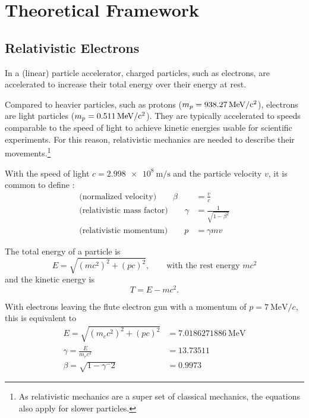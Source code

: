 \chapter{Theoretical Framework}
\section{Relativistic Electrons}
In a (linear) particle accelerator, charged particles, such as electrons, are accelerated to increase their total energy over their energy at rest.

Compared to heavier particles, such as protons ($m_p=\SI{938.27}{\mega\eV\per c\squared}$), electrons are light particles ($m_p=\SI{0.511}{\mega\eV\per c\squared}$). They are typically accelerated to speeds comparable to the speed of light to achieve kinetic energies usable for scientific experiments. For this reason, relativistic mechanics are needed to describe their movements.\footnote{As relativistic mechanics are a super set of classical mechanics, the equations also apply for slower particles.} \cite{Hinterberger1997}

With the speed of light $c=\SI{2.998e8}{\m\per\s}$ and the particle velocity $v$, it is common to define \cite{Wangler2008}:
\begin{align}\label{eq:theoreticalFramework_gammabeta}
\text{(normalized velocity)}\qquad\beta &= \frac{v}{c}\\
\text{(relativistic mass factor)}\qquad\gamma &= \frac{1}{\sqrt{1-\beta^2}} \\
\text{(relativistic momentum)}\qquad p &= \gamma m v 
\end{align}

The total energy of a particle is \cite{Hinterberger1997}
\begin{equation}
E=\sqrt{(mc^2)^2+(pc)^2},\qquad\text{with the rest energy } mc^2
\end{equation}
and the kinetic energy is
\begin{equation}
T=E-mc^2.
\end{equation}

With electrons leaving the \gls{flute} electron gun with a momentum of $p=\SI{7}{\MeV\per c}$, this is equivalent to
\begin{align}
E=\sqrt{(m_ec^2)^2+(pc)^2} &= \SI{7.0186271886}{\MeV}\\
\gamma = \frac{E}{m_ec^2} &= \num{13.73511}\\
\beta = \sqrt{1-\gamma^-2} &= 0.9973
\end{align}

